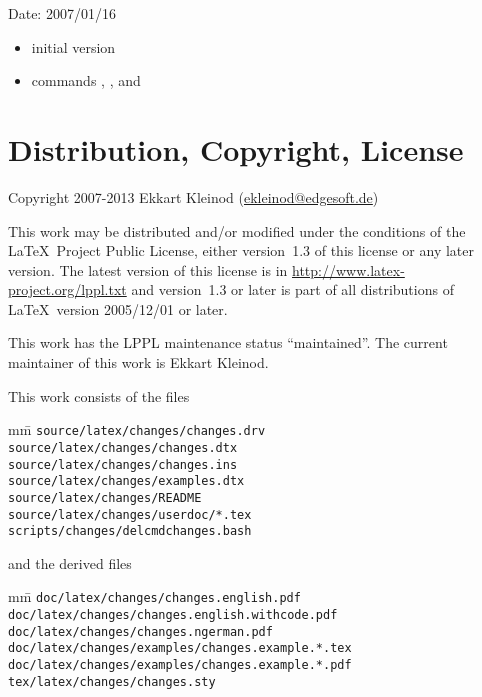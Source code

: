 
Date: 2007/01/16
\begin{itemize}
	\item initial version
	\item commands , , and 
\end{itemize}


\section{Distribution, Copyright, License}

Copyright 2007-2013 Ekkart Kleinod (\href{mailto:ekleinod@edgesoft.de}{ekleinod@edgesoft.de})

This work may be distributed and/or modified under the conditions of the \LaTeX\ Project Public License, either version~1.3 of this license or any later version.
The latest version of this license is in \url{http://www.latex-project.org/lppl.txt} and version~1.3 or later is part of all distributions of \LaTeX\ version 2005/12/01 or later.

This work has the LPPL maintenance status ``maintained''.
The current maintainer of this work is Ekkart Kleinod.

This work consists of the files

\begin{tabbing}
	mm\=\kill
	\>\texttt{source/latex/changes/changes.drv}\\
	\>\texttt{source/latex/changes/changes.dtx}\\
	\>\texttt{source/latex/changes/changes.ins}\\
	\>\texttt{source/latex/changes/examples.dtx}\\
	\>\texttt{source/latex/changes/README}\\
	\>\texttt{source/latex/changes/userdoc/*.tex}\\

	\>\texttt{scripts/changes/delcmdchanges.bash}
\end{tabbing}


and the derived files

\begin{tabbing}
	mm\=\kill
	\>\texttt{doc/latex/changes/changes.english.pdf}\\
	\>\texttt{doc/latex/changes/changes.english.withcode.pdf}\\
	\>\texttt{doc/latex/changes/changes.ngerman.pdf}\\

	\>\texttt{doc/latex/changes/examples/changes.example.*.tex}\\
	\>\texttt{doc/latex/changes/examples/changes.example.*.pdf}\\

	\>\texttt{tex/latex/changes/changes.sty}
\end{tabbing}



